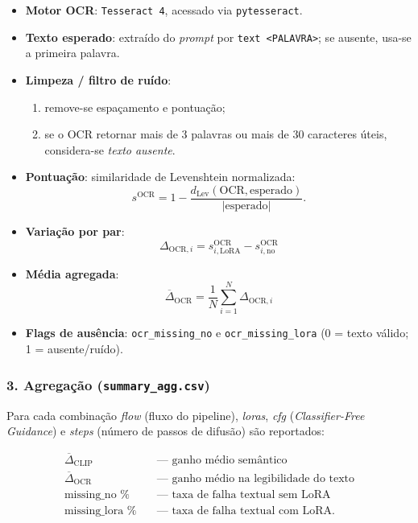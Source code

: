 \documentclass[12pt, %
openright, 
oneside, %
a4paper,    %
brazil]{facom-ufu-abntex2}
\begin{document}
\begin{itemize}
  \item \textbf{Motor OCR}: \texttt{Tesseract 4}, acessado via \texttt{pytesseract}.
  \item \textbf{Texto esperado}: extraído do \textit{prompt} por
        \verb|text <PALAVRA>|; se ausente, usa-se a primeira palavra.
  \item \textbf{Limpeza / filtro de ruído}:
        \begin{enumerate}
          \item remove-se espaçamento e pontuação;
          \item se o OCR retornar mais de $3$ palavras ou mais de $30$ caracteres
                úteis, considera-se \emph{texto ausente}.
        \end{enumerate}
  \item \textbf{Pontuação}: similaridade de Levenshtein normalizada:
        \[
          s^{\text{OCR}} = 1 -
            \frac{d_{\text{Lev}}(\text{OCR},\text{esperado})}
                 {|\text{esperado}|}.
        \]
  \item \textbf{Variação por par}:  
        \[
          \boxed{\,
            \Delta_{\text{OCR},i} =
            s^{\text{OCR}}_{i,\text{LoRA}} -
            s^{\text{OCR}}_{i,\text{no}}
          \,}
        \]
  \item \textbf{Média agregada}:  
        \[
          \boxed{\,
            \overline{\Delta}_{\text{OCR}} =
            \frac{1}{N}
            \sum_{i=1}^{N}
            \Delta_{\text{OCR},i}
          \,}
        \]
  \item \textbf{Flags de ausência}:
        \verb|ocr_missing_no| e \verb|ocr_missing_lora| (0 = texto válido; 1 = ausente/ruído).
\end{itemize}

\subsubsection*{3. Agregação (\texttt{summary\_agg.csv})}

Para cada combinação \emph{flow} (fluxo do pipeline), \emph{loras},
\emph{cfg} (\emph{Classifier-Free Guidance}) e \emph{steps}
(número de passos de difusão) são reportados:

\begin{align*}
  \overline{\Delta}_{\text{CLIP}} &\quad\text{— ganho médio semântico} \\
  \overline{\Delta}_{\text{OCR}}  &\quad\text{— ganho médio na legibilidade do texto} \\
  \text{missing\_no \%}           &\quad\text{— taxa de falha textual sem LoRA} \\
  \text{missing\_lora \%}         &\quad\text{— taxa de falha textual com LoRA}.
\end{align*}
\end{document}
